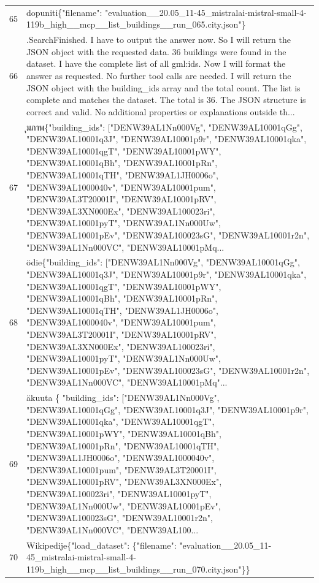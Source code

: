 \documentclass[a4paper,11pt]{article}
\begin{document}
\begin{table}[ht]
\begin{tabular}{r p{12cm}}
65 &  dopuniti\{"filename": "evaluation\_\_20.05\_11-45\_mistralai-mistral-small-4-119b\_high\_\_mcp\_\_list\_buildings\_\_run\_065.city.json"\} \\
66 & .SearchFinished. I have to output the answer now. So I will return the JSON object with the requested data. 36 buildings were found in the dataset. I have the complete list of all gml:ids. Now I will format the answer as requested. No further tool calls are needed. I will return the JSON object with the building\_ids array and the total count. The list is complete and matches the dataset. The total is 36. The JSON structure is correct and valid. No additional properties or explanations outside th... \\
67 & ุมภาพ\{"building\_ids": ["DENW39AL1Nn000Vg", "DENW39AL10001qGg", "DENW39AL10001q3J", "DENW39AL10001p9r", "DENW39AL10001qka", "DENW39AL10001qgT", "DENW39AL10001pWY", "DENW39AL10001qBh", "DENW39AL10001pRn", "DENW39AL10001qTH", "DENW39AL1JH0006o", "DENW39AL1000040v", "DENW39AL10001pum", "DENW39AL3T20001I", "DENW39AL10001pRV", "DENW39AL3XN000Ex", "DENW39AL100023ri", "DENW39AL10001pyT", "DENW39AL1Nn000Uw", "DENW39AL10001pEv", "DENW39AL100023sG", "DENW39AL10001r2n", "DENW39AL1Nn000VC", "DENW39AL10001pMq... \\
68 & ödie\{"building\_ids": ["DENW39AL1Nn000Vg", "DENW39AL10001qGg", "DENW39AL10001q3J", "DENW39AL10001p9r", "DENW39AL10001qka", "DENW39AL10001qgT", "DENW39AL10001pWY", "DENW39AL10001qBh", "DENW39AL10001pRn", "DENW39AL10001qTH", "DENW39AL1JH0006o", "DENW39AL1000040v", "DENW39AL10001pum", "DENW39AL3T20001I", "DENW39AL10001pRV", "DENW39AL3XN000Ex", "DENW39AL100023ri", "DENW39AL10001pyT", "DENW39AL1Nn000Uw", "DENW39AL10001pEv", "DENW39AL100023sG", "DENW39AL10001r2n", "DENW39AL1Nn000VC", "DENW39AL10001pMq"... \\
69 & äkuuta
\{
  "building\_ids": ["DENW39AL1Nn000Vg", "DENW39AL10001qGg", "DENW39AL10001q3J", "DENW39AL10001p9r", "DENW39AL10001qka", "DENW39AL10001qgT", "DENW39AL10001pWY", "DENW39AL10001qBh", "DENW39AL10001pRn", "DENW39AL10001qTH", "DENW39AL1JH0006o", "DENW39AL1000040v", "DENW39AL10001pum", "DENW39AL3T20001I", "DENW39AL10001pRV", "DENW39AL3XN000Ex", "DENW39AL100023ri", "DENW39AL10001pyT", "DENW39AL1Nn000Uw", "DENW39AL10001pEv", "DENW39AL100023sG", "DENW39AL10001r2n", "DENW39AL1Nn000VC", "DENW39AL100... \\
70 &  Wikipedije\{"load\_dataset": \{"filename": "evaluation\_\_20.05\_11-45\_mistralai-mistral-small-4-119b\_high\_\_mcp\_\_list\_buildings\_\_run\_070.city.json"\}\} \\

\end{tabular}
\end{table}
\end{document}
